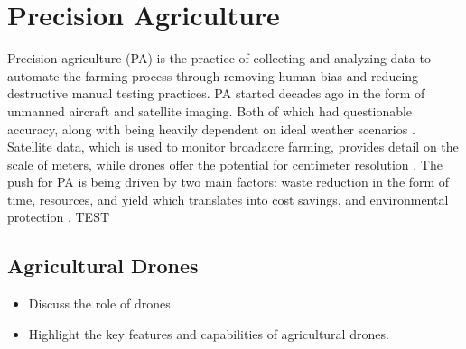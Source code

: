 \documentclass{IEEEtran}
\begin{document}

\section{Precision Agriculture}
Precision agriculture (PA) is the practice of collecting and analyzing data to automate the farming process through removing human bias and reducing destructive manual testing practices. PA started decades ago
in the form of unmanned aircraft and satellite imaging. Both of which had questionable accuracy, along with being heavily dependent on ideal weather scenarios \cite{HAFEEZ2023192}. Satellite data, which is used
to monitor broadacre farming, provides detail on the scale of meters, while drones offer the potential for centimeter resolution \cite{Huuskonen_Oksanen_2018b}. The push for PA is being driven by two main factors: waste reduction in the form
of time, resources, and yield which translates into cost savings, and environmental protection \cite{HAFEEZ2023192}. TEST

\subsection{Agricultural Drones}
    \begin{itemize}
        \item Discuss the role of drones.
        \item Highlight the key features and capabilities of agricultural drones.
    \end{itemize}
\end{document}
